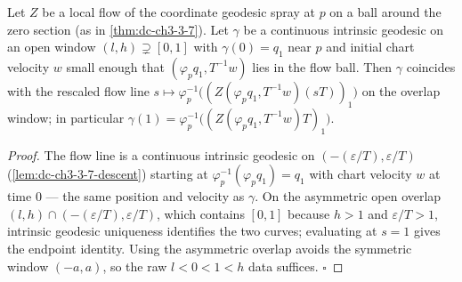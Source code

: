\begin{lemma}
  \label{lem:dc-ch3-4-2-endpoint-id}
  \leanok
  Let $Z$ be a local flow of the coordinate geodesic spray at $p$ on a ball around the zero section
  (as in \cref{thm:dc-ch3-3-7}). Let $\gamma$ be a continuous intrinsic geodesic on an open window
  $(l,h)\supsetneq[0,1]$ with $\gamma(0)=q_1$ near $p$ and initial chart velocity $w$ small enough that
  $(\varphi_p q_1,T^{-1}w)$ lies in the flow ball. Then $\gamma$ coincides with the rescaled flow line
  $s\mapsto\varphi_p^{-1}\big((Z(\varphi_p q_1,T^{-1}w)(sT))_1\big)$ on the overlap window; in
  particular $\gamma(1)=\varphi_p^{-1}\big((Z(\varphi_p q_1,T^{-1}w)T)_1\big)$.
\end{lemma}
\begin{proof}
  \leanok
  The flow line is a continuous intrinsic geodesic on $(-(\varepsilon/T),\varepsilon/T)$
  (\cref{lem:dc-ch3-3-7-descent}) starting at $\varphi_p^{-1}(\varphi_p q_1)=q_1$ with chart velocity
  $w$ at time $0$ --- the same position and velocity as $\gamma$. On the asymmetric open overlap
  $(l,h)\cap(-(\varepsilon/T),\varepsilon/T)$, which contains $[0,1]$ because $h>1$ and
  $\varepsilon/T>1$, intrinsic geodesic uniqueness identifies the two curves; evaluating at $s=1$ gives
  the endpoint identity. Using the asymmetric overlap avoids the symmetric window $(-a,a)$, so the raw
  $l<0<1<h$ data suffices. $\square$
\end{proof}

